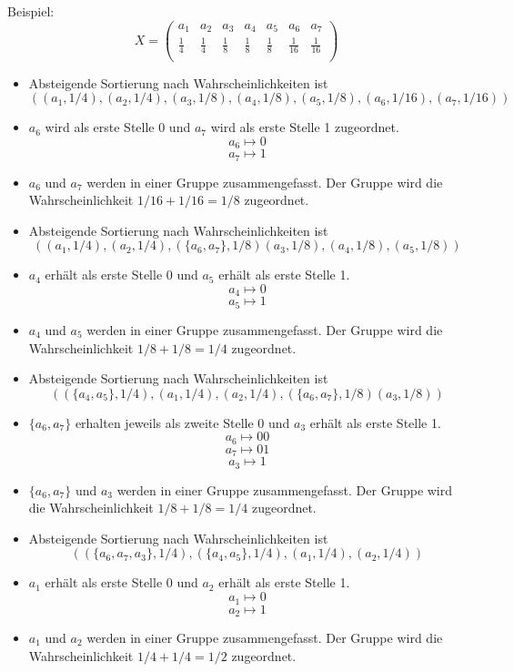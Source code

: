 Beispiel: 
$$
X = 
\left(
\begin{array}{*{7}{c}}
	a_1         & a_2         & a_3         & a_4         & a_5         & a_6          & a_7          \\
	\frac{1}{4} & \frac{1}{4} & \frac{1}{8} & \frac{1}{8} & \frac{1}{8} & \frac{1}{16} & \frac{1}{16} \\
\end{array}
\right)
$$
\begin{itemize}
  \item Absteigende Sortierung nach Wahrscheinlichkeiten ist
  $$((a_1,1/4), (a_2,1/4), (a_3,1/8), (a_4,1/8), (a_5,1/8), (a_6,1/16), (a_7,1/16))$$
  \item $a_6$ wird als erste Stelle 0 und $a_7$ wird als erste Stelle 1 zugeordnet.
  $$ a_6 \mapsto 0 $$
  $$ a_7 \mapsto 1 $$
  \item $a_6$ und $a_7$ werden in einer Gruppe zusammengefasst. Der Gruppe wird die Wahrscheinlichkeit $1/16 + 1/16 = 1/8$ zugeordnet.

  \item Absteigende Sortierung nach Wahrscheinlichkeiten ist
  $$((a_1,1/4), (a_2,1/4), (\{a_6, a_7\},1/8) (a_3,1/8), (a_4,1/8), (a_5,1/8))$$
  \item $a_4$ erhält als erste Stelle 0 und $a_5$ erhält als erste Stelle 1.
  $$ a_4 \mapsto 0 $$
  $$ a_5 \mapsto 1 $$
  \item $a_4$ und $a_5$ werden in einer Gruppe zusammengefasst. Der Gruppe wird die Wahrscheinlichkeit $1/8 + 1/8 = 1/4$ zugeordnet.

  \item Absteigende Sortierung nach Wahrscheinlichkeiten ist
  $$((\{a_4,a_5\},1/4),(a_1,1/4), (a_2,1/4), (\{a_6, a_7\},1/8) (a_3,1/8))$$
  \item $\{a_6, a_7\}$ erhalten jeweils als zweite Stelle 0 und $a_3$ erhält als erste Stelle 1.
  $$ a_6 \mapsto 00 $$
  $$ a_7 \mapsto 01 $$
  $$ a_3 \mapsto 1 $$
  \item $\{a_6, a_7\}$ und $a_3$ werden in einer Gruppe zusammengefasst. Der Gruppe wird die Wahrscheinlichkeit $1/8 + 1/8 = 1/4$ zugeordnet.
  
  \item Absteigende Sortierung nach Wahrscheinlichkeiten ist
  $$((\{a_6, a_7, a_3\},1/4),(\{a_4,a_5\},1/4),(a_1,1/4), (a_2,1/4))$$
  \item $a_1$ erhält als erste Stelle 0 und $a_2$ erhält als erste Stelle 1.
  $$ a_1 \mapsto 0 $$
  $$ a_2 \mapsto 1 $$
  \item $a_1$ und $a_2$ werden in einer Gruppe zusammengefasst. Der Gruppe wird die Wahrscheinlichkeit $1/4 + 1/4 = 1/2$ zugeordnet.
  

\end{itemize}
